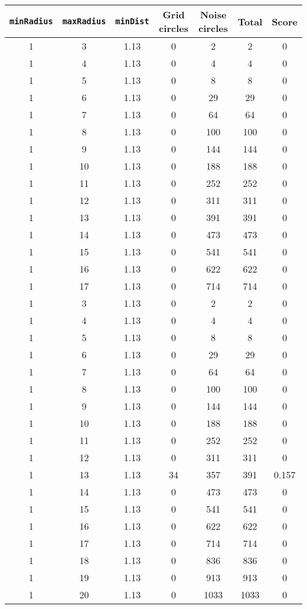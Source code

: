\documentclass[letterpaper, 12pt]{article}
\begin{document}
\begin{longtable}{|c|c|c|c|c|c|c|}
\hline
\textbf{\texttt{minRadius}} & \textbf{\texttt{maxRadius}} & \textbf{\texttt{minDist}} & \textbf{Grid circles} & \textbf{Noise circles} & \textbf{Total} & \textbf{Score} \\
\hline
1 & 3 & 1.13 & 0 & 2 & 2 & 0 \\
\hline
1 & 4 & 1.13 & 0 & 4 & 4 & 0 \\
\hline
1 & 5 & 1.13 & 0 & 8 & 8 & 0 \\
\hline
1 & 6 & 1.13 & 0 & 29 & 29 & 0 \\
\hline
1 & 7 & 1.13 & 0 & 64 & 64 & 0 \\
\hline
1 & 8 & 1.13 & 0 & 100 & 100 & 0 \\
\hline
1 & 9 & 1.13 & 0 & 144 & 144 & 0 \\
\hline
1 & 10 & 1.13 & 0 & 188 & 188 & 0 \\
\hline
1 & 11 & 1.13 & 0 & 252 & 252 & 0 \\
\hline
1 & 12 & 1.13 & 0 & 311 & 311 & 0 \\
\hline
1 & 13 & 1.13 & 0 & 391 & 391 & 0 \\
\hline
1 & 14 & 1.13 & 0 & 473 & 473 & 0 \\
\hline
1 & 15 & 1.13 & 0 & 541 & 541 & 0 \\
\hline
1 & 16 & 1.13 & 0 & 622 & 622 & 0 \\
\hline
1 & 17 & 1.13 & 0 & 714 & 714 & 0 \\
\hline
1 & 3 & 1.13 & 0 & 2 & 2 & 0 \\
\hline
1 & 4 & 1.13 & 0 & 4 & 4 & 0 \\
\hline
1 & 5 & 1.13 & 0 & 8 & 8 & 0 \\
\hline
1 & 6 & 1.13 & 0 & 29 & 29 & 0 \\
\hline
1 & 7 & 1.13 & 0 & 64 & 64 & 0 \\
\hline
1 & 8 & 1.13 & 0 & 100 & 100 & 0 \\
\hline
1 & 9 & 1.13 & 0 & 144 & 144 & 0 \\
\hline
1 & 10 & 1.13 & 0 & 188 & 188 & 0 \\
\hline
1 & 11 & 1.13 & 0 & 252 & 252 & 0 \\
\hline
1 & 12 & 1.13 & 0 & 311 & 311 & 0 \\
\hline
1 & 13 & 1.13 & 34 & 357 & 391 & 0.157 \\
\hline
1 & 14 & 1.13 & 0 & 473 & 473 & 0 \\
\hline
1 & 15 & 1.13 & 0 & 541 & 541 & 0 \\
\hline
1 & 16 & 1.13 & 0 & 622 & 622 & 0 \\
\hline
1 & 17 & 1.13 & 0 & 714 & 714 & 0 \\
\hline
1 & 18 & 1.13 & 0 & 836 & 836 & 0 \\
\hline
1 & 19 & 1.13 & 0 & 913 & 913 & 0 \\
\hline
1 & 20 & 1.13 & 0 & 1033 & 1033 & 0 \\
\hline
\end{longtable}
\end{document}
